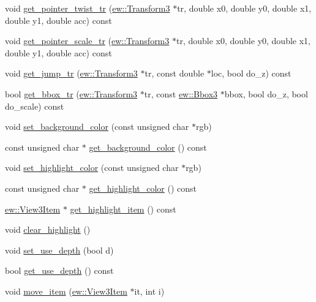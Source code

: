 \begin{DoxyCompactItemize}
\item 
void \hyperlink{classew_1_1View3Widget_aed81f4b06017dcd6f7095ffbe336cc36}{get\_\-pointer\_\-twist\_\-tr} (\hyperlink{classew_1_1Transform3}{ew::Transform3} $\ast$tr, double x0, double y0, double x1, double y1, double acc) const 
\item 
void \hyperlink{classew_1_1View3Widget_aad8067affea3157ffdf0a1244d5b45a0}{get\_\-pointer\_\-scale\_\-tr} (\hyperlink{classew_1_1Transform3}{ew::Transform3} $\ast$tr, double x0, double y0, double x1, double y1, double acc) const 
\item 
void \hyperlink{classew_1_1View3Widget_addd0136b3a10935e7debc2ed8ce63f6a}{get\_\-jump\_\-tr} (\hyperlink{classew_1_1Transform3}{ew::Transform3} $\ast$tr, const double $\ast$loc, bool do\_\-z) const 
\item 
bool \hyperlink{classew_1_1View3Widget_a47413c17524f0468f3a00e267613a40e}{get\_\-bbox\_\-tr} (\hyperlink{classew_1_1Transform3}{ew::Transform3} $\ast$tr, const \hyperlink{classew_1_1Bbox3}{ew::Bbox3} $\ast$bbox, bool do\_\-z, bool do\_\-scale) const 
\item 
void \hyperlink{classew_1_1View3Widget_a3fe14ba566b730c481fc9acd60d8efe2}{set\_\-background\_\-color} (const unsigned char $\ast$rgb)
\item 
const unsigned char $\ast$ \hyperlink{classew_1_1View3Widget_ae859867b7de4143a46544c4db5c1b7ea}{get\_\-background\_\-color} () const 
\item 
void \hyperlink{classew_1_1View3Widget_a4b4c5d30d57462b08bbab7fb6647c2b5}{set\_\-highlight\_\-color} (const unsigned char $\ast$rgb)
\item 
const unsigned char $\ast$ \hyperlink{classew_1_1View3Widget_a17351ef9948598e285a62808a8005fdf}{get\_\-highlight\_\-color} () const 
\item 
\hyperlink{classew_1_1View3Item}{ew::View3Item} $\ast$ \hyperlink{classew_1_1View3Widget_a34306d9080701483074f92d9492f01ef}{get\_\-highlight\_\-item} () const 
\item 
void \hyperlink{classew_1_1View3Widget_aea2f17d964e9c9fef29416a3b216f7ef}{clear\_\-highlight} ()
\item 
void \hyperlink{classew_1_1View3Widget_a17b0de1a0412b27b47b611ca33deb1ac}{set\_\-use\_\-depth} (bool d)
\item 
bool \hyperlink{classew_1_1View3Widget_aab44e8f083e9db8fa4753b5e889b8cc6}{get\_\-use\_\-depth} () const 
\item 
void \hyperlink{classew_1_1View3Widget_a787a7f05c4da472d3c8cfb3b4899f052}{move\_\-item} (\hyperlink{classew_1_1View3Item}{ew::View3Item} $\ast$it, int i)

\end{DoxyCompactItemize}
